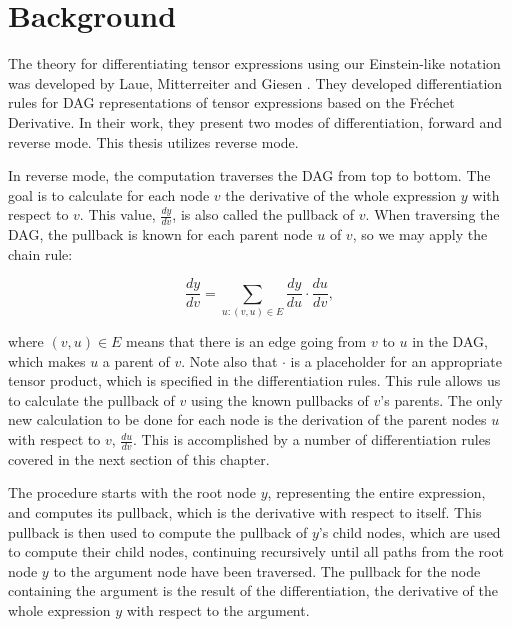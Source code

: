 \documentclass[12pt, a4paper]{report} %
\begin{document}
\section{Background}
The theory for differentiating tensor expressions using our Einstein-like notation was developed by Laue, Mitterreiter and Giesen \cite{tensorpaper}.
They developed differentiation rules for DAG representations of tensor expressions based on the Fr\'{e}chet Derivative.
In their work, they present two modes of differentiation, forward and reverse mode.
This thesis utilizes reverse mode.

In reverse mode, the computation traverses the DAG from top to bottom.
The goal is to calculate for each node $v$ the derivative of the whole expression $y$ with respect to $v$.
This value, $\frac{dy}{dv}$, is also called the pullback of $v$.
When traversing the DAG, the pullback is known for each parent node $u$ of $v$, so we may apply the chain rule:

\begin{equation}
    \frac{dy}{dv} = \sum_{u: (v,u) \in E} \frac{dy}{du} \cdot \frac{du}{dv},
    \label{eq:diff}
\end{equation}

where $(v,u) \in E$ means that there is an edge going from $v$ to $u$ in the DAG, which makes $u$ a parent of $v$. 
Note also that $\cdot$ is a placeholder for an appropriate tensor product, which is specified in the differentiation rules. 
This rule allows us to calculate the pullback of $v$ using the known pullbacks of $v$'s parents.
The only new calculation to be done for each node is the derivation of the parent nodes $u$ with respect to $v$, $\frac{du}{dv}$.
This is accomplished by a number of differentiation rules covered in the next section of this chapter.

The procedure starts with the root node $y$, representing the entire expression, and computes its pullback, which is the derivative with respect to itself.
This pullback is then used to compute the pullback of $y$'s child nodes, which are used to compute their child nodes, continuing recursively until all paths from the root node $y$ to the argument node have been traversed.
The pullback for the node containing the argument is the result of the differentiation, the derivative of the whole expression $y$ with respect to the argument.
\end{document}
